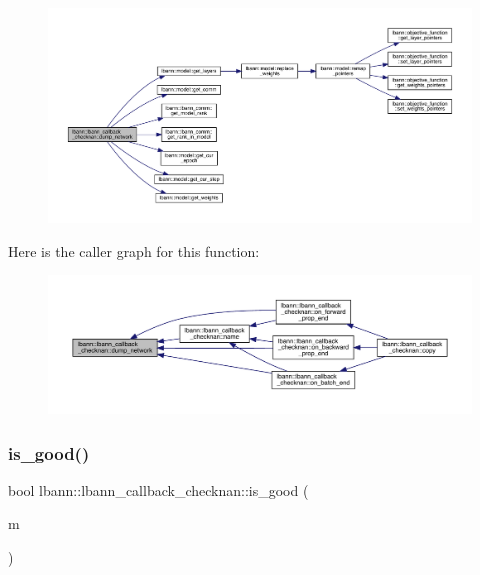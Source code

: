 \begin{figure}[H]
\begin{center}
\leavevmode
\includegraphics[width=350pt]{classlbann_1_1lbann__callback__checknan_a335713a3df9194f657f98cccd2f695f5_cgraph}
\end{center}
\end{figure}
Here is the caller graph for this function\+:\nopagebreak
\begin{figure}[H]
\begin{center}
\leavevmode
\includegraphics[width=350pt]{classlbann_1_1lbann__callback__checknan_a335713a3df9194f657f98cccd2f695f5_icgraph}
\end{center}
\end{figure}
\mbox{\label{classlbann_1_1lbann__callback__checknan_ac74f7f665823d0500875b9740aaccabc}} 
\subsubsection{\texorpdfstring{is\+\_\+good()}{is\_good()}}
{\footnotesize\ttfamily bool lbann\+::lbann\+\_\+callback\+\_\+checknan\+::is\+\_\+good (\begin{DoxyParamCaption}\item[{const \hyperlink{base_8hpp_a9a697a504ae84010e7439ffec862b470}{Abs\+Dist\+Mat} \&}]{m }\end{DoxyParamCaption})\hspace{0.3cm}{\ttfamily [private]}}

